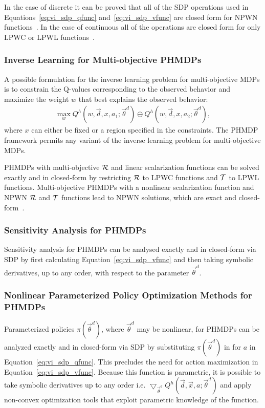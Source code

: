 In the case of discrete {\footnotesize \Action} it can be proved that all of the SDP operations used in Equations~\eqref{eq:vi_sdp_qfunc} and~\eqref{eq:vi_sdp_vfunc} are closed form for NPWN functions~\cite{Sanner_UAI_2011}. In the case of continuous {\footnotesize \Action} all of the operations are closed form for only LPWC or LPWL functions~\cite{Zamani_AAAI_2012}.

\subsubsection{Inverse Learning for Multi-objective PHMDPs}

A possible formulation for the inverse learning problem for multi-objective MDPs is to constrain the Q-values corresponding to the observed behavior and maximize the weight {\footnotesize $ w $} that best explains the observed behavior: 
\begin{align}
    \max_w Q^{h} \left(w, \vec{d}, x, a_1; \vec{\theta}^d \right) \ominus Q^{h} \left(w, \vec{d}, x, a_2; \vec{\theta}^d \right),
\end{align}
where {\footnotesize $ x $} can either be fixed or a region specified in the constraints. The PHMDP framework permits any variant of the inverse learning problem for multi-objective MDPs.

PHMDPs with multi-objective {\footnotesize $\mathcal{R}$} and linear scalarization functions can be solved exactly and in closed-form by restricting {\footnotesize $\mathcal{R}$} to LPWC functions and {\footnotesize $\mathcal{T}$} to LPWL functions. Multi-objective PHMDPs with a nonlinear scalarization function and NPWN {\footnotesize $\mathcal{R}$} and {\footnotesize $\mathcal{T}$} functions lead to NPWN solutions, which are exact and closed-form~\cite{Sanner_UAI_2011}.

\subsubsection{Sensitivity Analysis for PHMDPs}

Sensitivity analysis for PHMDPs can be analysed exactly and in closed-form via SDP by first calculating Equation~\eqref{eq:vi_sdp_vfunc} and then taking symbolic derivatives, up to any order, with respect to the parameter {\footnotesize $\vec{\theta}^{d}$}.

\subsubsection{Nonlinear Parameterized Policy Optimization Methods for PHMDPs}

Parameterized policies {\footnotesize $ \pi(\vec{\theta}^{d}) $}, where {\footnotesize $\vec{\theta}^{d}$} may be nonlinear, for PHMDPs can be analyzed exactly and in closed-form via SDP by substituting {\footnotesize $ \pi(\vec{\theta}^{d}) $} in for {\footnotesize  $ a $} in Equation~\eqref{eq:vi_sdp_qfunc}. This precludes the need for action maximization in Equation~\eqref{eq:vi_sdp_vfunc}. Because this function is parametric, it is possible to take symbolic derivatives up to any order i.e. {\footnotesize $\bigtriangledown_{\vec{\theta}^{d}} Q^{h}(\vec{d}, \vec{x}, a; \vec{\theta}^{d})$ } and apply non-convex optimization tools that exploit parametric knowledge of the function. 